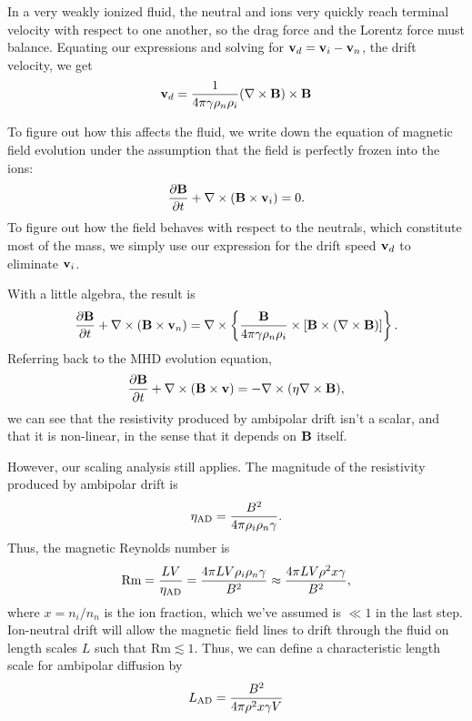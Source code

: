 In a very weakly ionized fluid, the neutral and ions very quickly reach terminal velocity with respect to one another, so the drag force and the Lorentz force must balance. Equating our expressions and solving for $\mathbf{v}_d=\mathbf{v}_i-\mathbf{v}_n$, the drift velocity, we get
\begin{equation}
\mathbf{v}_d  = \frac{1}{4\pi\gamma\rho_n\rho_i}(\nabla\times\mathbf{B})\times\mathbf{B}
\end{equation}

To figure out how this affects the fluid, we write down the equation of magnetic field evolution under the assumption that the field is perfectly frozen into the ions:
\begin{equation}
\frac{\partial \mathbf{B}}{\partial t} + \nabla\times(\mathbf{B}\times \mathbf{v}_i) = 0.
\end{equation}
To figure out how the field behaves with respect to the neutrals, which constitute most of the mass, we simply use our expression for the drift speed $\mathbf{v}_d$ to eliminate $\mathbf{v}_i$.

With a little algebra, the result is
\begin{equation}
\frac{\partial \mathbf{B}}{\partial t} + \nabla\times(\mathbf{B}\times \mathbf{v}_n) = 
\nabla \times \left\{ \frac{\mathbf{B}}{4\pi\gamma\rho_n\rho_i}\times\left[\mathbf{B}\times(\nabla\times\mathbf{B})\right]\right\}.
\end{equation}
Referring back to the MHD evolution equation,
\begin{equation}
\frac{\partial \mathbf{B}}{\partial t} + \nabla \times (\mathbf{B} \times \mathbf{v}) = -\nabla \times (\eta \nabla \times \mathbf{B}),
\end{equation}
we can see that the resistivity produced by ambipolar drift isn't a scalar, and that it is non-linear, in the sense that it depends on $\mathbf{B}$ itself.

However, our scaling analysis still applies. The magnitude of the resistivity produced by ambipolar drift is
\begin{equation}
\eta_{\rm AD} = \frac{B^2}{4\pi\rho_i\rho_n\gamma}.
\end{equation}
Thus, the magnetic Reynolds number is
\begin{equation}
\mbox{Rm} = \frac{LV}{\eta_{\rm AD}} = \frac{4\pi L V \rho_i\rho_n\gamma}{B^2} \approx \frac{4\pi L V \rho^2 x\gamma}{B^2},
\end{equation}
where $x=n_i/n_n$ is the ion fraction, which we've assumed is $\ll 1$ in the last step. Ion-neutral drift will allow the magnetic field lines to drift through the fluid on length scales $L$ such that $\mbox{Rm}\lesssim 1$. Thus, we can define a characteristic length scale for ambipolar diffusion by
\begin{equation}
L_{\rm AD} = \frac{B^2}{4\pi\rho^2 x \gamma V}
\end{equation}

